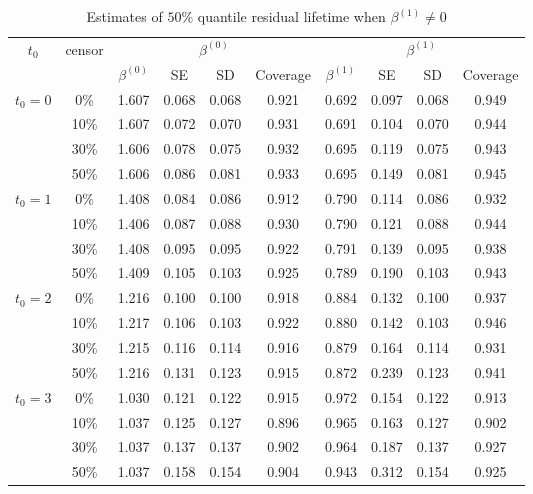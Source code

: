\documentclass[titlepage,english,12pt]{article}
\begin{document}
	\begin{table}[H] \label{table:5}
		\caption{Estimates of $50\%$ quantile residual lifetime when $\beta^{(1)} \neq 0$}
		\centering
		\begin{tabular}{|c|c|c|c|c|c|c|c|c|c|}
			\hline
			\multirow{2}{*}{$t_0$} & \multirow{2}{*}{censor} & \multicolumn{4}{c|}{$\beta^{(0)}$} & \multicolumn{4}{c|}{$\beta^{(1)}$}\\ \cline{3-10}
			& & $\beta^{(0)}$ & SE & SD  & Coverage  & $\beta^{(1)}$ & SE & SD & Coverage\\
			\hline\hline
			\multirow{4}{*}{$t_0=0$} & 0\% & 1.607 & 0.068 & 0.068 & 0.921 & 0.692 & 0.097 & 0.068 & 0.949 \\
			& 10\% & 1.607 & 0.072 & 0.070 & 0.931 & 0.691 & 0.104 & 0.070 & 0.944 \\
			& 30\% & 1.606 & 0.078 & 0.075 & 0.932 & 0.695 & 0.119 & 0.075 & 0.943 \\
			& 50\% & 1.606 & 0.086 & 0.081 & 0.933 & 0.695 & 0.149 & 0.081 & 0.945 \\
			\hline
			\multirow{4}{*}{$t_0=1$} & 0\% & 1.408 & 0.084 & 0.086 & 0.912 & 0.790 & 0.114 & 0.086 & 0.932 \\
			& 10\% & 1.406 & 0.087 & 0.088 & 0.930 & 0.790 & 0.121 & 0.088 & 0.944 \\
			& 30\% & 1.408 & 0.095 & 0.095 & 0.922 & 0.791 & 0.139 & 0.095 & 0.938 \\
			& 50\% & 1.409 & 0.105 & 0.103 & 0.925 & 0.789 & 0.190 & 0.103 & 0.943 \\
			\hline
			\multirow{4}{*}{$t_0=2$} & 0\% & 1.216 & 0.100 & 0.100 & 0.918 & 0.884 & 0.132 & 0.100 & 0.937 \\
			& 10\% & 1.217 & 0.106 & 0.103 & 0.922 & 0.880 & 0.142 & 0.103 & 0.946 \\
			& 30\% & 1.215 & 0.116 & 0.114 & 0.916 & 0.879 & 0.164 & 0.114 & 0.931 \\
			& 50\% & 1.216 & 0.131 & 0.123 & 0.915 & 0.872 & 0.239 & 0.123 & 0.941 \\
			\hline
			\multirow{4}{*}{$t_0=3$} & 0\% & 1.030 & 0.121 & 0.122 & 0.915 & 0.972 & 0.154 & 0.122 & 0.913 \\
			& 10\% & 1.037 & 0.125 & 0.127 & 0.896 & 0.965 & 0.163 & 0.127 & 0.902 \\
			& 30\% & 1.037 & 0.137 & 0.137 & 0.902 & 0.964 & 0.187 & 0.137 & 0.927 \\
			& 50\% & 1.037 & 0.158 & 0.154 & 0.904 & 0.943 & 0.312 & 0.154 & 0.925 \\
			\hline
		\end{tabular}
	\end{table}
\end{document}
